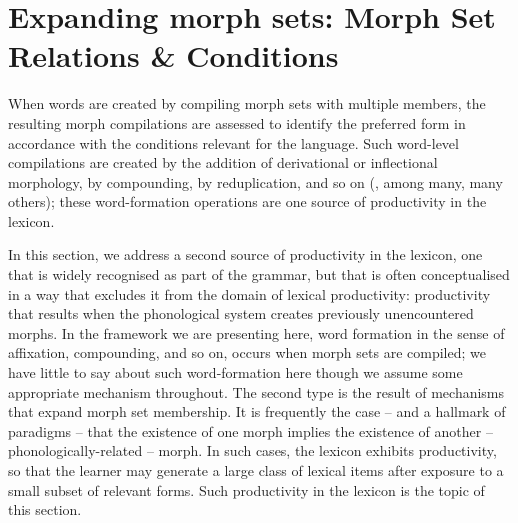 \section{Expanding morph sets: Morph Set Relations \& Conditions}\label{Yangben-MSRs-section}
\label{Yangben-tr-alternations}



When words are created by compiling morph sets with multiple members, the resulting morph compilations are assessed to identify the preferred form in accordance with the conditions relevant for the language. Such word-level compilations are created by the addition of derivational or inflectional morphology, by compounding, by reduplication, and so on (\citealt{Aronoff:1976, Kiparsky:1982lexical-phonology, Lieber:1992}, among many, many others); these word-formation operations are one source of productivity in the lexicon. 

In this section, we address a second source of productivity in the lexicon, one that is widely recognised as part of the grammar, but that is often conceptualised in a way that excludes it from the domain of lexical productivity: productivity that results when  the phonological system creates previously unencountered morphs. In the framework we are presenting here, word formation in the sense of affixation, compounding, and so on, occurs when morph sets are compiled; we have little to say about such word-formation here though we assume some appropriate mechanism throughout. The second type is the result of mechanisms that expand morph set membership. It is frequently the case -- and a hallmark of paradigms -- that the existence of one morph implies the existence of another -- phonologically-related -- morph. In such cases, the lexicon exhibits productivity, so that the learner may generate a large class of lexical items after exposure to a small subset of relevant forms. Such productivity in the lexicon is the topic of this section.




